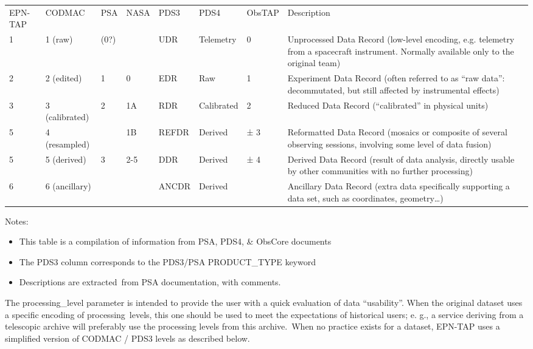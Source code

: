 \documentclass[11pt,a4paper]{ivoa}
\begin{document}
\begingroup\small\begin{inlinetable}
\begin{tabular}{lllllllp{}}
\sptablerule
EPN-TAP&CODMAC&PSA&NASA&PDS3&PDS4&ObsTAP&Description\\
\sptablerule

1 &1 (raw)&(0?)&&UDR&Telemetry&0&Unprocessed Data Record (low-level encoding, e.g. telemetry from a spacecraft instrument. Normally available only to the original team)\\
2 &2 (edited)&1&0&EDR&Raw&1&Experiment Data Record (often referred to as ``raw data'': decommutated, but still affected by instrumental effects)\\
3 &3 (calibrated)&2&1A&RDR&Calibrated&2&Reduced Data Record (``calibrated'' in physical units)\\
5&4 (resampled)&&1B&REFDR&Derived&± 3&Reformatted Data Record (mosaics or composite of several observing sessions, involving some level of data fusion)\\
5 &5 (derived)&3&2-5&DDR&Derived&± 4&Derived Data Record (result of data analysis, directly usable by other communities with no further processing)\\
6&6 (ancillary)&&&ANCDR&Derived&&Ancillary Data Record (extra data specifically supporting a data set, such as coordinates, geometry…) \\
\end{tabular}
\end{inlinetable}\endgroup

Notes:

\begin{itemize}
\item This table is a compilation of information from PSA, PDS4, \& ObsCore documents
\item The PDS3 column corresponds to the PDS3/PSA PRODUCT\_TYPE keyword
\item Descriptions are extracted from PSA documentation, with comments.
\end{itemize}

The processing\_level parameter is intended to provide the user with a quick evaluation of data ``usability''. When the original dataset uses a specific encoding of processing levels, this one should be used to meet the expectations of historical users; e. g., a service deriving from a telescopic archive will preferably use the processing levels from this archive. When no practice exists for a dataset, EPN-TAP uses a simplified version of CODMAC / PDS3 levels as described below.
\end{document}
